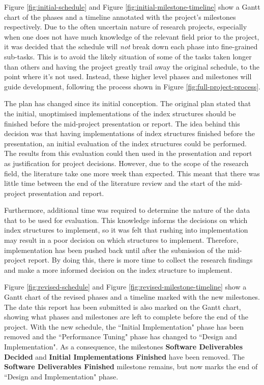 Figure \ref{fig:initial-schedule} and Figure \ref{fig:initial-milestone-timeline} show a Gantt chart of the phases and a timeline annotated with the project's milestones respectively. Due to the often uncertain nature of research projects, especially when one does not have much knowledge of the relevant field prior to the project, it was decided that the schedule will \textit{not} break down each phase into fine-grained sub-tasks. This is to avoid the likely situation of some of the tasks taken longer than others and having the project greatly trail away the original schedule, to the point where it's not used. Instead, these higher level phases and milestones will guide development, following the process shown in Figure \ref{fig:full-project-process}.

The plan has changed since its initial conception. The original plan stated that the initial, unoptimised implementations of the index structures should be finished before the mid-project presentation or report. The idea behind this decision was that having implementations of index structures finished before the presentation, an initial evaluation of the index structures could be performed. The results from this evaluation could then used in the presentation and report as justification for project decisions. However, due to the scope of the research field, the literature take one more week than expected. This meant that there was little time between the end of the literature review and the start of the mid-project presentation and report.

Furthermore, additional time was required to determine the nature of the data that to be used for evaluation. This knowledge informs the decisions on which index structures to implement, so it was felt that rushing into implementation may result in a poor decision on which structures to implement. Therefore, implementation has been pushed back until after the submission of the mid-project report. By doing this, there is more time to collect the research findings and make a more informed decision on the index structure to implement.

Figure \ref{fig:revised-schedule} and Figure \ref{fig:revised-milestone-timeline} show a Gantt chart of the revised phases and a timeline marked with the new milestones. The date this report has been submitted is also marked on the Gantt chart, showing what phases and milestones are left to complete before the end of the project. With the new schedule, the ``Initial Implementation" phase has been removed and the ``Performance Tuning" phase has changed to ``Design and Implementation". As a consequence, the milestones \textbf{Software Deliverables Decided} and \textbf{Initial Implementations Finished} have been removed. The \textbf{Software Deliverables Finished} milestone remains, but now marks the end of ``Design and Implementation" phase.

